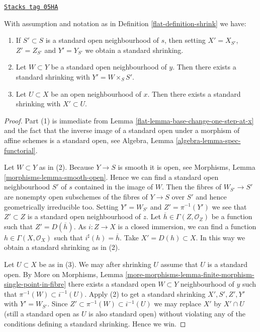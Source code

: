 \begin{lemma}[Shrink]
\label{flat-lemma-shrink}
\href{https://stacks.math.columbia.edu/tag/05HA}{\texttt{Stacks tag 05HA}}

With assumption and notation as in
Definition \ref{flat-definition-shrink}
we have:
\begin{enumerate}
\item
\label{flat-item-shrink-base}
If $S' \subset S$ is a standard open neighbourhood of $s$, then
setting $X' = X_{S'}$, $Z' = Z_{S'}$ and $Y' = Y_{S'}$ we obtain a
standard shrinking.
\item
\label{flat-item-shrink-on-Y}
Let $W \subset Y$ be a standard open neighbourhood of $y$.
Then there exists a standard shrinking with $Y' = W \times_S S'$.
\item
\label{flat-item-shrink-on-X}
Let $U \subset X$ be an open neighbourhood of $x$.
Then there exists a standard shrinking with $X' \subset U$.
\end{enumerate}
\end{lemma}

\begin{proof}

Part (1) is immediate from
Lemma \ref{flat-lemma-base-change-one-step-at-x}
and the fact that the inverse image of a standard open under a morphism
of affine schemes is a standard open, see
Algebra, Lemma \ref{algebra-lemma-spec-functorial}.

\medskip\noindent
Let $W \subset Y$ as in (2). Because $Y \to S$ is smooth it is open, see
Morphisms, Lemma \ref{morphisms-lemma-smooth-open}.
Hence we can find a standard open neighbourhood $S'$ of $s$
contained in the image of $W$. Then the fibres of $W_{S'} \to S'$
are nonempty open subschemes of the fibres of $Y \to S$ over $S'$
and hence geometrically irreducible too. Setting $Y' = W_{S'}$
and $Z' = \pi^{-1}(Y')$ we see that $Z' \subset Z$ is a standard open
neighbourhood of $z$. Let $\overline{h} \in \Gamma(Z, \mathcal{O}_Z)$
be a function such that $Z' = D(\overline{h})$. As $i : Z \to X$
is a closed immersion, we can find a function $h \in \Gamma(X, \mathcal{O}_X)$
such that $i^\sharp(h) = \overline{h}$. Take $X' = D(h) \subset X$.
In this way we obtain a standard shrinking as in (2).

\medskip\noindent
Let $U \subset X$ be as in (3). We may after shrinking $U$ assume that
$U$ is a standard open. By
More on Morphisms,
Lemma \ref{more-morphisms-lemma-finite-morphism-single-point-in-fibre}
there exists a standard open $W \subset Y$ neighbourhood of $y$ such
that $\pi^{-1}(W) \subset i^{-1}(U)$. Apply (2) to get a standard
shrinking $X', S', Z', Y'$ with $Y' = W_{S'}$. Since
$Z' \subset \pi^{-1}(W) \subset i^{-1}(U)$ we may replace $X'$ by
$X' \cap U$ (still a standard open as $U$ is also standard open)
without violating any of the conditions defining a standard shrinking.
Hence we win.
\end{proof}

